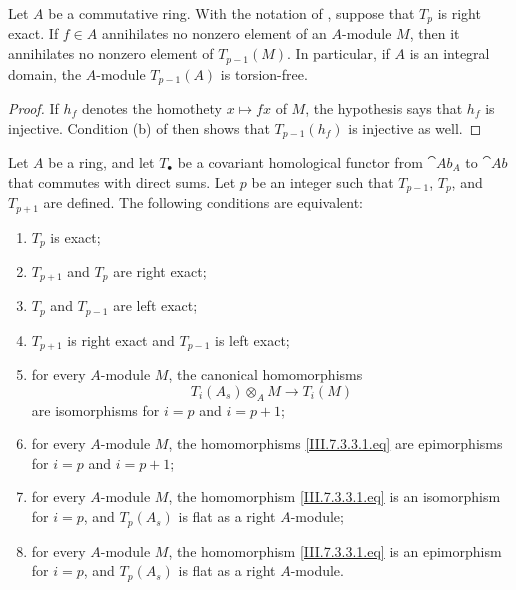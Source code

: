\begin{corollary}[7.3.2]
\label{III.7.3.2}
Let $A$ be a commutative ring.  With the notation of
, suppose that $T_p$ is right exact.  If
$f\in A$ annihilates no nonzero element of an $A$-module $M$,
then it annihilates no nonzero element of $T_{p-1}(M)$.  In
particular, if $A$ is an integral domain, the $A$-module
$T_{p-1}(A)$ is torsion-free.
\end{corollary}

\begin{proof}
If $h_f$ denotes the homothety $x\mapsto fx$ of $M$, the
hypothesis says that $h_f$ is injective.  Condition (b) of
 then shows that $T_{p-1}(h_f)$ is injective
as well.
\end{proof}

\begin{proposition}[7.3.3]
\label{III.7.3.3}
Let $A$ be a ring, and let $T_\bullet$ be a covariant
homological functor from $\cat{Ab}_A$ to $\cat{Ab}$ that
commutes with direct sums.  Let $p$ be an integer such that
$T_{p-1}$, $T_p$, and $T_{p+1}$ are defined.  The following
conditions are equivalent:
\begin{enumerate}
  \item[(a)] $T_p$ is exact;
  \item[(b)] $T_{p+1}$ and $T_p$ are right exact;
  \item[(c)] $T_p$ and $T_{p-1}$ are left exact;
  \item[(d)] $T_{p+1}$ is right exact and $T_{p-1}$ is left
    exact;
  \item[(e)] for every $A$-module $M$, the canonical
    homomorphisms
    \[
      T_i(A_s)\otimes_A M
      \longrightarrow
      T_i(M)
      \tag{7.3.3.1}\label{III.7.3.3.1.eq}
    \]
    are isomorphisms for $i=p$ and $i=p+1$;
  \item[($\mathrm{e}'$)] for every $A$-module $M$, the
    homomorphisms \eqref{III.7.3.3.1.eq} are epimorphisms for
    $i=p$ and $i=p+1$;
  \item[(f)] for every $A$-module $M$, the homomorphism
    \eqref{III.7.3.3.1.eq} is an isomorphism for $i=p$, and
    $T_p(A_s)$ is flat as a right $A$-module;
  \item[($\mathrm{f}'$)] for every $A$-module $M$, the
    homomorphism \eqref{III.7.3.3.1.eq} is an epimorphism for
    $i=p$, and $T_p(A_s)$ is flat as a right $A$-module.
\end{enumerate}
\end{proposition}

